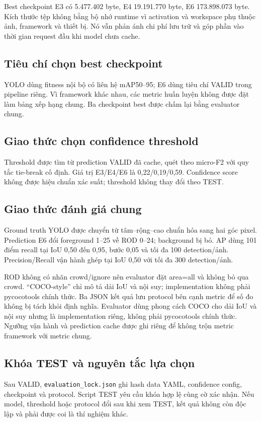 \documentclass[12pt,a4paper,oneside]{report}
\begin{document}
Best checkpoint E3 có 5.477.402 byte, E4 19.191.770 byte, E6 173.898.073 byte. Kích thước tệp không bằng bộ nhớ runtime vì activation và workspace phụ thuộc ảnh, framework và thiết bị. Nó vẫn phản ánh chi phí lưu trữ và góp phần vào thời gian request đầu khi model chưa cache.
\subsection{Tiêu chí chọn best checkpoint}
YOLO dùng fitness nội bộ có liên hệ mAP50--95; E6 dùng tiêu chí VALID trong pipeline riêng. Vì framework khác nhau, các metric huấn luyện không được đặt làm bảng xếp hạng chung. Ba checkpoint best được chấm lại bằng evaluator chung.
\subsection{Giao thức chọn confidence threshold}
Threshold được tìm từ prediction VALID đã cache, quét theo micro-F2 với quy tắc tie-break cố định. Giá trị E3/E4/E6 là 0,22/0,19/0,59. Confidence score không được hiệu chuẩn xác suất; threshold không thay đổi theo TEST.
\subsection{Giao thức đánh giá chung}
Ground truth YOLO được chuyển từ tâm--rộng--cao chuẩn hóa sang hai góc pixel. Prediction E6 đổi foreground 1--25 về ROD 0--24; background bị bỏ. AP dùng 101 điểm recall tại IoU 0,50 đến 0,95, bước 0,05 và tối đa 100 detection/ảnh. Precision/Recall vận hành ghép tại IoU 0,50 với tối đa 300 detection/ảnh.

ROD không có nhãn crowd/ignore nên evaluator đặt area=all và không bỏ qua crowd. “COCO-style” chỉ mô tả dải IoU và nội suy; implementation không phải pycocotools chính thức. Ba JSON kết quả lưu protocol bên cạnh metric để số đo không bị tách khỏi định nghĩa.
Evaluator dùng phong cách COCO cho dải IoU và nội suy nhưng là implementation riêng, không phải pycocotools chính thức. Ngưỡng vận hành và prediction cache được ghi riêng để không trộn metric framework với metric chung.
\subsection{Khóa TEST và nguyên tắc lựa chọn}
Sau VALID, \texttt{evaluation\_lock.json} ghi hash data YAML, confidence config, checkpoint và protocol. Script TEST yêu cầu khóa hợp lệ cùng cờ xác nhận. Nếu model, threshold hoặc protocol đổi sau khi xem TEST, kết quả không còn độc lập và phải được coi là thí nghiệm khác.
\end{document}
